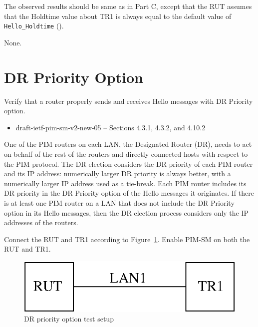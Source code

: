 \documentclass[11pt]{report}
\begin{document}

The observed results should be same as in Part C, except that
the RUT assumes that the Holdtime value about TR1 is always equal to the
default value of \verb=Hello_Holdtime= ({\PimsmHelloHoldtime}).

None.

\newpage
\section{DR Priority Option}

Verify that a router properly sends and receives Hello messages with DR
Priority option.

\begin{itemize}
  \item draft-ietf-pim-sm-v2-new-05 -- Sections 4.3.1, 4.3.2, and 4.10.2
\end{itemize}

One of the PIM routers on each LAN, the Designated Router (DR), needs to act
on behalf of the rest of the routers and directly connected hosts with respect
to the PIM protocol. The DR election considers the DR priority of each
PIM router and its IP address: numerically larger DR priority is always
better, with a numerically larger IP address used as a tie-break. Each PIM
router includes its DR priority in the DR Priority option of the Hello
messages it originates. If there is at least one PIM router on a LAN that does
not include the DR Priority option in its Hello messages, then the DR election
process considers only the IP addresses of the routers.

Connect the RUT and TR1 according to Figure~\ref{fig:pim_test_2_5_dr_priority_option}.
Enable PIM-SM on both the RUT and TR1.

\begin{figure}[htbp]
  \begin{center}
    \includegraphics[scale=0.8]{figs/pim_test_2_5_dr_priority_option}
    \caption{DR priority option test setup}
    \label{fig:pim_test_2_5_dr_priority_option}
  \end{center}
\end{figure}
\end{document}
